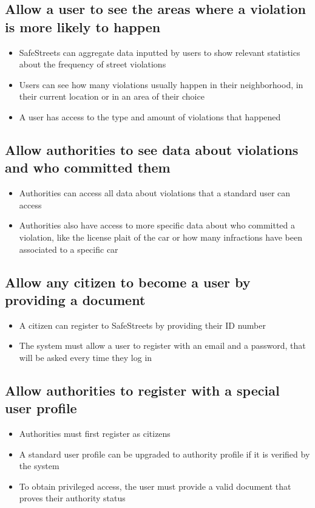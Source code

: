 \begin{itemize}
\subsection{Allow a user to see the areas where a violation is more likely to happen}
\begin{itemize}
    \item SafeStreets can aggregate data inputted by users to show relevant statistics about the frequency of street violations
    \item Users can see how many violations usually happen in their neighborhood, in their current location or in an area of their choice
    \item A user has access to the type and amount of violations that happened
\end{itemize}

\subsection{Allow authorities to see data about violations and who committed them}
\begin{itemize}
    \item Authorities can access all data about violations that a standard user can access
    \item Authorities also have access to more specific data about who committed a violation, like the license plait of the car or how many infractions have been associated to a specific car
\end{itemize}

\subsection{Allow any citizen to become a user by providing a document}
\begin{itemize}
    \item A citizen can register to SafeStreets by providing their ID number
    \item The system must allow a user to register with an email and a password, that will be asked every time they log in
\end{itemize}

\subsection{Allow authorities to register with a special user profile}
\begin{itemize}
    \item Authorities must first register as citizens
    \item A standard user profile can be upgraded to authority profile if it is verified by the system
    \item To obtain privileged access, the user must provide a valid document that proves their authority status
\end{itemize}


\end{itemize}
